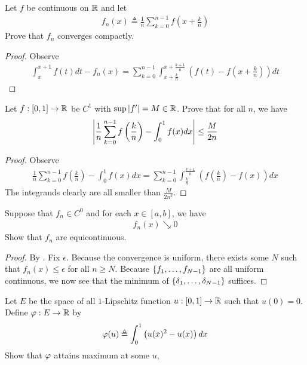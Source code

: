 \documentclass{report}
\begin{document}
\begin{question}{}{}
Let $f$ be continuous on $\mathbb{R}$ and let 
 \begin{align*}
f_n(x)\triangleq \frac{1}{n}\sum_{k=0}^{n-1} f\left(x+\frac{k}{n} \right)
\end{align*}
Prove that $f_n$ converges compactly. 
\end{question}
\begin{proof}
Observe 
\begin{align*}
\int_{x}^{x+1} f(t)dt - f_n(x)= \sum_{k=0}^{n-1} \int_{x+\frac{k}{n}}^{x+ \frac{k+1}{n}} \left(f(t)- f(x+\frac{k}{n}) \right) dt 
\end{align*}
\end{proof}
\begin{question}{}{}
Let $f:[0,1]\rightarrow \mathbb{R}$ be $C^1$ with  $\sup \left|f'\right| = M \in\mathbb{R}$. Prove that for all $n$, we have 
\begin{align*}
\left|\frac{1}{n}\sum_{k=0}^{n-1}f\left(\frac{k}{n} \right) - \int_0^1 f(x)dx\right| \leq \frac{M}{2n}
\end{align*}
\end{question}
\begin{proof}
Observe 
\begin{align*}
\frac{1}{n} \sum_{k=0}^{n-1}f\left(\frac{k}{n} \right)- \int_0^1 f(x)dx = \sum_{k=0}^{n-1}\int_{\frac{k}{n}}^{\frac{k+1}{n}} \left(f\left(\frac{k}{n} \right) - f(x) \right)dx
\end{align*}
The integrands clearly are all smaller than $\frac{M}{2n^2}$. 
\end{proof}
\begin{question}{}{}
Suppose that $f_n \in C^0$ and for each $x \in [a,b]$, we have 
\begin{align*}
f_n(x)\searrow 0
\end{align*}
Show that $f_n$ are equicontinuous. 
\end{question}
\begin{proof}
  By . Fix $\epsilon $. Because the convergence is uniform, there exists some $N$ such that  $f_n(x)\leq \epsilon $ for all $n\geq N$. Because $\left\{ f_1,\dots ,f_{N-1} \right\}$ are all uniform continuous, we now see that the minimum of $\left\{ \delta_1,\dots ,\delta_{N-1} \right\}$ suffices. 
\end{proof}
\begin{question}{}{}
Let $E$ be the space of all $1$-Lipschitz function $u:[0,1]\rightarrow \mathbb{R}$  such that $u(0)=0$. Define $\pfi  : E \rightarrow \R$ by 
\begin{align*}
  \pfi(u)\triangleq \int_0^1 \left(u(x)^2 - u(x) \right)dx
\end{align*}
Show that $\pfi $ attains maximum at some $u$, 
\end{question}
\end{document}
